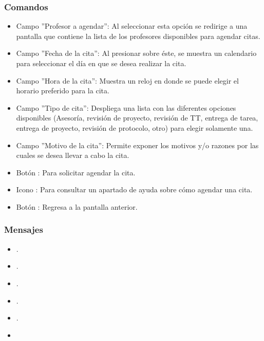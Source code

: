 \subsubsection{Comandos}
	\begin{itemize}
		\item Campo ''Profesor a agendar'': Al seleccionar esta opción se redirige a una pantalla que contiene la lista de los profesores disponibles para agendar citas.
		\item Campo ''Fecha de la cita'': Al presionar sobre éste, se muestra un calendario para seleccionar el día en que se desea realizar la cita.
		\item Campo ''Hora de la cita'': Muestra un reloj en donde se puede elegir el horario preferido para la cita.	
		\item Campo ''Tipo de cita'': Despliega una lista con las diferentes opciones disponibles (Asesoría, revisión de proyecto, revisión de TT, entrega de tarea, entrega de proyecto, revisión de protocolo, otro) para elegir solamente una. 
		\item Campo ''Motivo de la cita'': Permite exponer los motivos y/o razones por las cuales se desea llevar a cabo la cita.	
		\item Botón : Para solicitar agendar la cita.
		\item Icono : Para consultar un apartado de ayuda sobre cómo agendar una cita.
		\item Botón : Regresa a la pantalla anterior.
	\end{itemize}

\subsubsection{Mensajes}
	\begin{itemize}
		\item {}.
		\item {}.
		\item {}.
		\item {}.
		\item {}.
		\item {}
	\end{itemize}

\pagebreak

